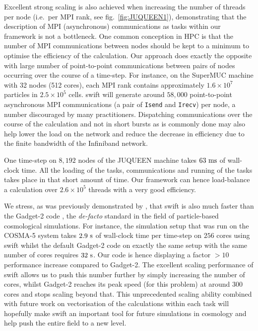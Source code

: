 \documentclass{sig-alternate-05-2015}
\newcommand{\gadget}{{\sc Gadget-2}\xspace}
\newcommand{\swift}{{\sc swift}\xspace}
\begin{document}
Excellent strong scaling is also achieved when increasing the number of threads
per node (i.e.~per MPI rank, see fig.~\ref{fig:JUQUEEN1}), demonstrating that
the description of MPI (asynchronous) communications as tasks within our
framework is not a bottleneck. One common conception in HPC is that the number
of MPI communications between nodes should be kept to a minimum to optimise the
efficiency of the calculation. Our approach does exactly the opposite with large
number of point-to-point communications between pairs of nodes occurring over the
course of a time-step. For instance, on the SuperMUC machine with 32 nodes (512
cores), each MPI rank contains approximately $1.6\times10^7$ particles in
$2.5\times10^5$ cells. \swift will generate around $58,000$ point-to-point
asynchronous MPI communications (a pair of \texttt{Isend} and \texttt{Irecv})
per node, a number discouraged by many practitioners. Dispatching communications
over the course of the calculation and not in short bursts as is commonly done
may also help lower the load on the network and reduce the decrease in
efficiency due to the finite bandwidth of the Infiniband network.

One time-step on $8,192$ nodes of the JUQUEEN machine takes $63~\rm{ms}$ of
wall-clock time. All the loading of the tasks, communications and running of the
tasks takes place in that short amount of time. Our framework can hence
load-balance a calculation over $2.6\times10^5$ threads with a very good
efficiency.

We stress, as was previously demonstrated by \cite{ref:Gonnet2015}, that \swift
is also much faster than the \gadget code \cite{Springel2005}, the
\emph{de-facto} standard in the field of particle-based cosmological
simulations. For instance, the simulation setup that was run on the COSMA-5
system takes $2.9~\rm{s}$ of wall-clock time per time-step on $256$ cores using
\swift whilst the default \gadget code on exactly the same setup with the same
number of cores requires $32~\rm{s}$. Our code is hence displaying a factor
$>10$ performance increase compared to \gadget. The excellent scaling
performance of \swift allows us to push this number further by simply increasing
the number of cores, whilst \gadget reaches its peak speed (for this problem) at
around 300 cores and stops scaling beyond that. This unprecedented scaling
ability combined with future work on vectorisation of the calculations within
each task will hopefully make \swift an important tool for future simulations in
cosmology and help push the entire field to a new level.
\end{document}

